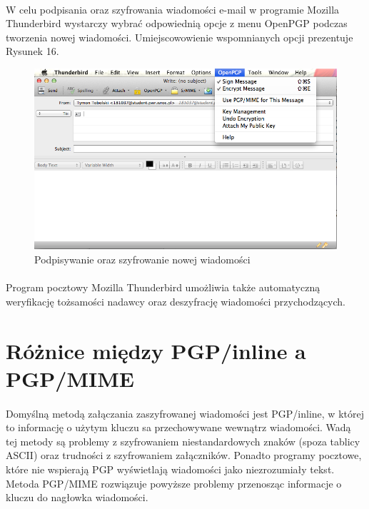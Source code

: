 \documentclass[wide,a4paper,titlepage,12pt] {article}
\begin{document}
  \paragraph{}
  W celu podpisania oraz szyfrowania wiadomości e-mail w programie Mozilla Thunderbird wystarczy wybrać odpowiednią opcje z menu OpenPGP podczas tworzenia nowej wiadomości. Umiejscowowienie wspomnianych opcji prezentuje Rysunek 16.

  \begin{figure}[h!]
    \begin{center}
      \includegraphics[width=\textwidth]{img/16.png}
      \caption{Podpisywanie oraz szyfrowanie nowej wiadomości}
    \end{center}
  \end{figure}

  \paragraph{}
  Program pocztowy Mozilla Thunderbird umożliwia także automatyczną weryfikację tożsamości nadawcy oraz deszyfrację wiadomości przychodzących.

  \newpage
  \section{Różnice między PGP/inline a PGP/MIME}
  \paragraph{}
  Domyślną metodą załączania zaszyfrowanej wiadomości jest PGP/inline, w której to informację o użytym kluczu sa przechowywane wewnątrz wiadomości. Wadą tej metody są problemy z szyfrowaniem niestandardowych znaków (spoza tablicy ASCII) oraz trudności z szyfrowaniem załączników. Ponadto programy pocztowe, które nie wspierają PGP wyświetlają wiadomości jako niezrozumiały tekst. Metoda PGP/MIME rozwiązuje powyższe problemy przenosząc informacje o kluczu do nagłowka wiadomości.
\end{document}
